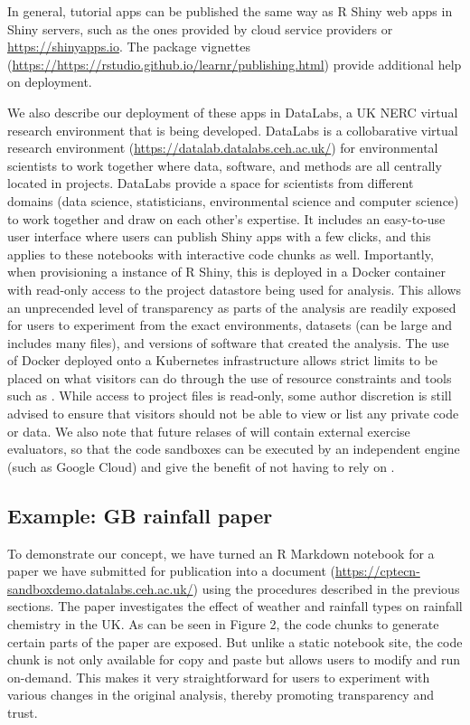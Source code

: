 In general,  tutorial apps can be published the same way
as R Shiny web apps in Shiny servers, such as the ones provided by cloud
service providers or \url{https://shinyapps.io}. The 
package vignettes
(\url{https://https://rstudio.github.io/learnr/publishing.html}) provide
additional help on deployment.

We also describe our deployment of these apps in DataLabs, a UK NERC
virtual research environment that is being developed. DataLabs is a
collobarative virtual research environment \citep{Hollaway2020}
(\url{https://datalab.datalabs.ceh.ac.uk/}) for environmental scientists
to work together where data, software, and methods are all centrally
located in projects. DataLabs provide a space for scientists from
different domains (data science, statisticians, environmental science
and computer science) to work together and draw on each other's
expertise. It includes an easy-to-use user interface where users can
publish Shiny apps with a few clicks, and this applies to these
notebooks with interactive code chunks as well. Importantly, when
provisioning a instance of R Shiny, this is deployed in a Docker
container with read-only access to the project datastore being used for
analysis. This allows an unprecended level of transparency as parts of
the analysis are readily exposed for users to experiment from the exact
environments, datasets (can be large and includes many files), and
versions of software that created the analysis. The use of Docker
deployed onto a Kubernetes infrastructure allows strict limits to be
placed on what visitors can do through the use of resource constraints
and tools such as  \citep{RAppArmor}. While access to
project files is read-only, some author discretion is still advised to
ensure that visitors should not be able to view or list any private code
or data. We also note that future relases of  will
contain external exercise evaluators, so that the code sandboxes can be
executed by an independent engine (such as Google Cloud) and give the
benefit of not having to rely on .

\hypertarget{example-gb-rainfall-paper}{%
\subsection{Example: GB rainfall
paper}\label{example-gb-rainfall-paper}}

To demonstrate our concept, we have turned an R Markdown notebook for a
paper we have submitted for publication into a  document
(\url{https://cptecn-sandboxdemo.datalabs.ceh.ac.uk/}) using the
procedures described in the previous sections. The paper investigates
the effect of weather and rainfall types on rainfall chemistry in the
UK. As can be seen in Figure 2, the code chunks to generate certain
parts of the paper are exposed. But unlike a static notebook site, the
code chunk is not only available for copy and paste but allows users to
modify and run on-demand. This makes it very straightforward for users
to experiment with various changes in the original analysis, thereby
promoting transparency and trust.

